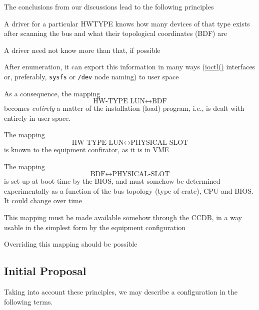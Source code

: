 \documentclass[12pt,a4paper]{article}
\newcommand\fname[1]{\texttt{#1}}
\begin{document}
The conclusions from our discussions lead to the following principles
\begin{compactitem}
\item A driver for a particular HWTYPE knows how many devices of that
type exists after scanning the bus and what their topological
coordinates (BDF) are
\item A driver need not know more than that, if possible
\item After enumeration, it can export this information in many ways
(\url{ioctl()} interfaces or, preferably, \fname{sysfs} or \fname{/dev}
node naming) to user space
\item As a consequence, the mapping
\begin{equation*}
\text{HW-TYPE LUN} \leftrightarrow \text{BDF}
\end{equation*}
becomes \emph{entirely} a matter of the installation (load) program,
i.e., is dealt with entirely in user space.
\item The mapping
\begin{equation*}
\text{HW-TYPE LUN} \leftrightarrow \text{PHYSICAL-SLOT}
\end{equation*}
is known to the equipment confirator, as it is in VME
\item The mapping
\begin{equation*}
\text{BDF} \leftrightarrow \text{PHYSICAL-SLOT}
\end{equation*}
is set up at boot time by the BIOS, and must somehow be determined
experimentally as a function of the bus topology (type of crate),
CPU and BIOS. It could change over time
\item This mapping must be made available somehow through the CCDB,
in a way usable in the simplest form by the equipment configuration
\item Overriding this mapping should be possible
\end{compactitem}

\subsection{Initial Proposal}

Taking into account these principles, we may describe a configuration in
the following terms.
\end{document}
